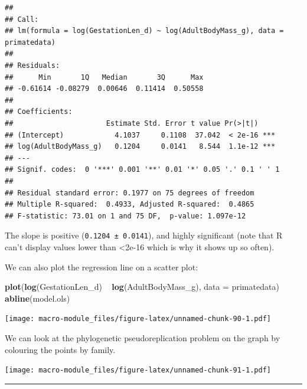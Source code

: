 \documentclass[]{book}
\newenvironment{Shaded}{\begin{snugshade}}{\end{snugshade}}
\newcommand{\KeywordTok}[1]{\textcolor[rgb]{0.13,0.29,0.53}{\textbf{{#1}}}}
\newcommand{\DataTypeTok}[1]{\textcolor[rgb]{0.13,0.29,0.53}{{#1}}}
\newcommand{\DecValTok}[1]{\textcolor[rgb]{0.00,0.00,0.81}{{#1}}}
\newcommand{\StringTok}[1]{\textcolor[rgb]{0.31,0.60,0.02}{{#1}}}
\newcommand{\NormalTok}[1]{{#1}}
\begin{document}
\begin{verbatim}
## 
## Call:
## lm(formula = log(GestationLen_d) ~ log(AdultBodyMass_g), data = primatedata)
## 
## Residuals:
##      Min       1Q   Median       3Q      Max 
## -0.61614 -0.08279  0.00646  0.11414  0.50558 
## 
## Coefficients:
##                      Estimate Std. Error t value Pr(>|t|)    
## (Intercept)            4.1037     0.1108  37.042  < 2e-16 ***
## log(AdultBodyMass_g)   0.1204     0.0141   8.544  1.1e-12 ***
## ---
## Signif. codes:  0 '***' 0.001 '**' 0.01 '*' 0.05 '.' 0.1 ' ' 1
## 
## Residual standard error: 0.1977 on 75 degrees of freedom
## Multiple R-squared:  0.4933, Adjusted R-squared:  0.4865 
## F-statistic: 73.01 on 1 and 75 DF,  p-value: 1.097e-12
\end{verbatim}

The slope is positive (\texttt{0.1204\ ±\ 0.0141}), and highly
significant (note that R can't display values lower than
\textless{}2e-16 which is why it shows up so often).

We can also plot the regression line on a scatter plot:

\begin{Shaded}
\begin{Highlighting}[]
\KeywordTok{plot}\NormalTok{(}\KeywordTok{log}\NormalTok{(GestationLen_d) ~}\StringTok{ }\KeywordTok{log}\NormalTok{(AdultBodyMass_g), }\DataTypeTok{data =} \NormalTok{primatedata)}
\KeywordTok{abline}\NormalTok{(model.ols)}
\end{Highlighting}
\end{Shaded}

\texttt{[image: macro-module\_files/figure-latex/unnamed-chunk-90-1.pdf]}

We can look at the phylogenetic pseudoreplication problem on the graph
by colouring the points by family.

\begin{Shaded}
\end{Shaded}

\texttt{[image: macro-module\_files/figure-latex/unnamed-chunk-91-1.pdf]}

\begin{center}\rule{0.5\linewidth}{\linethickness}\end{center}
\end{document}
